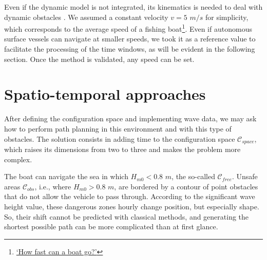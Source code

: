 Even if the dynamic model is not integrated, its kinematics is needed to deal with dynamic obstacles \cite{SONG2017301}. We assumed a constant velocity $v=5$ $m/s$ for simplicity, which corresponds to the average speed of a fishing boat\footnote{\href{https://shipfever.com/how-fast-can-a-boat-go/}{`How fast can a boat go?'}}. Even if autonomous surface vessels can navigate at smaller speeds, we took it as a reference value to facilitate the processing of the time windows, as will be evident in the following section. Once the method is validated, any speed can be set.


\section{Spatio-temporal approaches}
After defining the configuration space and implementing wave data, we may ask how to perform path planning in this environment and with this type of obstacles. The solution consists in adding time to the configuration space $\mathcal{C}_{space}$, which raises its dimensions from two to three and makes the problem more complex.

The boat can navigate the sea in which $H_{m0}<0.8$ $m$, the so-called $\mathcal{C}_{free}$. Unsafe areas $\mathcal{C}_{obs}$, i.e., where $H_{m0}>0.8$ $m$, are bordered by a contour of point obstacles that do not allow the vehicle to pass through. According to the significant wave height value, these dangerous zones hourly change position, but especially shape. So, their shift cannot be predicted with classical methods, and generating the shortest possible path can be more complicated than at first glance.

